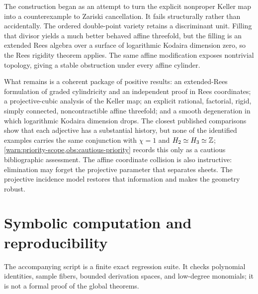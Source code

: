 \begin{observation}\label{obs:final-summary}
The construction began as an attempt to turn the explicit nonproper Keller map into a counterexample to Zariski cancellation.  It fails structurally rather than accidentally.  The ordered double-point variety retains a discriminant unit.  Filling that divisor yields a much better behaved affine threefold, but the filling is an extended Rees algebra over a surface of logarithmic Kodaira dimension zero, so the Rees rigidity theorem applies.  The same affine modification exposes nontrivial topology, giving a stable obstruction under every affine cylinder.

What remains is a coherent package of positive results: an extended-Rees formulation of graded cylindricity and an independent proof in Rees coordinates; a projective-cubic analysis of the Keller map; an explicit rational, factorial, rigid, simply connected, noncontractible affine threefold; and a smooth degeneration in which logarithmic Kodaira dimension drops.  The closest published comparisons show that each adjective has a substantial history, but none of the identified examples carries the same conjunction with $\chi=1$ and $H_2\simeq H_3\simeq\mathbb Z$; \cref{warn:priority-scope,obs:cautious-priority} records this only as a cautious bibliographic assessment.  The affine coordinate collision is also instructive: elimination may forget the projective parameter that separates sheets.  The projective incidence model restores that information and makes the geometry robust.
\end{observation}

\appendix
\section{Symbolic computation and reproducibility}\label{sec:computation}\label{app:computation}

\begin{computationalnote}\label{note:computation-scope}
The accompanying script is a finite exact regression suite.  It checks polynomial identities, sample fibers, bounded derivation spaces, and low-degree monomials; it is not a formal proof of the global theorems.
\end{computationalnote}

